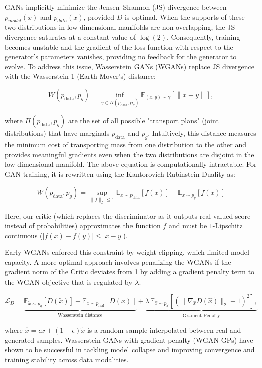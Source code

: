 GANs implicitly minimize the Jensen–Shannon (JS) divergence between $p_{model}(x)$ and $p_{data}(x)$, provided $D$ is optimal. When the supports of these two distributions in low-dimensional manifolds are non-overlapping, the JS divergence saturates at a constant value of $\log(2)$. Consequently, training becomes unstable and the gradient of the loss function with respect to the generator's parameters vanishes, providing no feedback for the generator to evolve. To address this issue, Wasserstein GANs (WGANs) \cite{arjovsky2017wasserstein} replace JS divergence with the Wasserstein-1 (Earth Mover’s) distance:

\[
W(p_{\text{data}}, p_g) = \inf_{\gamma \in \Pi(p_{\text{data}}, p_g)} \mathbb{E}_{(x, y) \sim \gamma} \left[ \| x - y \| \right],
\]

where $\Pi(p_{\text{data}}, p_g)$ are the set of all possible "transport plans" (joint distributions) that have marginals $p_{\text{data}}$ and $p_g$. Intuitively, this distance measures the minimum cost of transporting mass from one distribution to the other and provides meaningful gradients even when the two distributions are disjoint in the low-dimensional manifold. The above equation is computationally intractable. For GAN training, it is rewritten using the Kantorovich-Rubinstein Duality as:

\[
W(p_{\text{data}}, p_g) = \sup_{\| f \|_L \leq 1} \mathbb{E}_{x \sim p_{\text{data}}}[f(x)] - \mathbb{E}_{x \sim p_g}[f(x)]
\]

Here, our critic (which replaces the discriminator as it outputs real-valued score instead of probabilities) approximates the function $f$ and must be $1$-Lipschitz continuous ($|f(x) - f(y)| \le |x - y|$).

Early WGANs enforced this constraint by weight clipping, which limited model capacity. A more optimal approach involves penalizing the WGANs if the gradient norm of the Critic deviates from 1 by adding a gradient penalty term \cite{gulrajani2017improved} to the WGAN objective that is regulated by $\lambda$.

\[
\mathcal{L}_D = 
\underbrace{\mathbb{E}_{\tilde{x} \sim p_g}[D(\tilde{x})] - \mathbb{E}_{x \sim p_\text{real}}[D(x)]}_{\text{Wasserstein distance}}
+ 
\underbrace{\lambda \, \mathbb{E}_{\hat{x} \sim p_{\hat{x}}} \left[ \left(\|\nabla_{\hat{x}} D(\hat{x})\|_2 - 1\right)^2 \right],}_{\text{Gradient Penalty}}
\]

where $\hat{x} = \epsilon x + (1-\epsilon)\tilde{x}$ is a random sample interpolated between real and generated samples. Wasserstein GANs with gradient penalty (WGAN-GPs) have shown to be successful in tackling model collapse and improving convergence and training stability across data modalities.  




